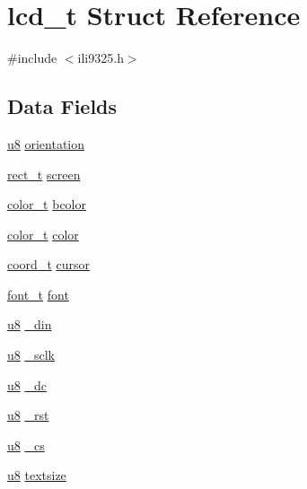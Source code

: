 \hypertarget{structlcd__t}{\section{lcd\-\_\-t Struct Reference}
\label{structlcd__t}
}


{\ttfamily \#include $<$ili9325.\-h$>$}

\subsection*{Data Fields}
\begin{DoxyCompactItemize}
\item 
\hyperlink{p8_2pinguino_2core_2typedef_8h_aed742c436da53c1080638ce6ef7d13de}{u8} \hyperlink{structlcd__t_a6d94b70b32de86c41ac93f2e2cc21093}{orientation}
\item 
\hyperlink{structrect__t}{rect\-\_\-t} \hyperlink{structlcd__t_a170959ba8d59769ce0c2ceebd8919217}{screen}
\item 
\hyperlink{structcolor__t}{color\-\_\-t} \hyperlink{structlcd__t_a30a1d46222004b922cb03a640ee42428}{bcolor}
\item 
\hyperlink{structcolor__t}{color\-\_\-t} \hyperlink{structlcd__t_a7b6a8ec65935cf4cd99c962fc7ec93f5}{color}
\item 
\hyperlink{structcoord__t}{coord\-\_\-t} \hyperlink{structlcd__t_a2465b2093554ecfe6a0b8a274e17a083}{cursor}
\item 
\hyperlink{structfont__t}{font\-\_\-t} \hyperlink{structlcd__t_a2efb3d8aba13baee6ea9250b1075454a}{font}
\item 
\hyperlink{p8_2pinguino_2core_2typedef_8h_aed742c436da53c1080638ce6ef7d13de}{u8} \hyperlink{structlcd__t_a7c3db95b39144d3fc60192e2f08beb29}{\-\_\-din}
\item 
\hyperlink{p8_2pinguino_2core_2typedef_8h_aed742c436da53c1080638ce6ef7d13de}{u8} \hyperlink{structlcd__t_adabf5610095f79e1ca781233a23f2c2a}{\-\_\-sclk}
\item 
\hyperlink{p8_2pinguino_2core_2typedef_8h_aed742c436da53c1080638ce6ef7d13de}{u8} \hyperlink{structlcd__t_adf10cf9d52f9a336b72a4465b4665cf4}{\-\_\-dc}
\item 
\hyperlink{p8_2pinguino_2core_2typedef_8h_aed742c436da53c1080638ce6ef7d13de}{u8} \hyperlink{structlcd__t_a6d45704f8cc0a5ac9fb38c69c4efa10e}{\-\_\-rst}
\item 
\hyperlink{p8_2pinguino_2core_2typedef_8h_aed742c436da53c1080638ce6ef7d13de}{u8} \hyperlink{structlcd__t_a2756566f95a83c4536681f348b552787}{\-\_\-cs}
\item 
\hyperlink{p8_2pinguino_2core_2typedef_8h_aed742c436da53c1080638ce6ef7d13de}{u8} \hyperlink{structlcd__t_a820362b03a1bac292c88f1ab216d3934}{textsize}
\end{DoxyCompactItemize}


